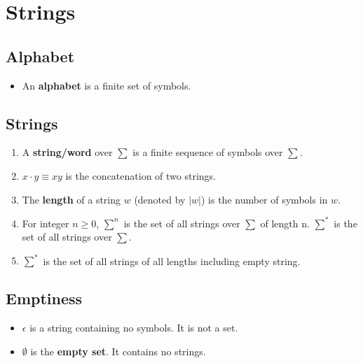 \documentclass[12pt]{article}
\date{January 26, 2021}
\begin{document}
\maketitle

\section{Strings}

\subsection{Alphabet}
\begin{itemize}
    \item An \textbf{alphabet} is a finite set of symbols.
\end{itemize}

\subsection{Strings}
\begin{enumerate}
    \item A \textbf{string/word} over $\sum$ is a finite sequence of symbols over $\sum$.
    \item $x \cdot y \equiv xy$ is the concatenation of two strings.
    \item The \textbf{length} of a string $w$ (denoted by $\left| w \right|$) is the number of symbols in $w$.
    \item For integer $n \geq 0$, $\sum^{n}$ is the set of all strings over $\sum$ of length n. $\sum^{\ast}$ is the set of all strings over $\sum$.
    \item $\sum^{\ast}$ is the set of all strings of all lengths including empty string.
\end{enumerate}

\subsection{Emptiness}
\begin{itemize}
    \item $\epsilon$ is a string containing no symbols. It is not a set.
    \item $\emptyset$ is the \textbf{empty set}. It contains no strings.
\end{itemize}
\end{document}
